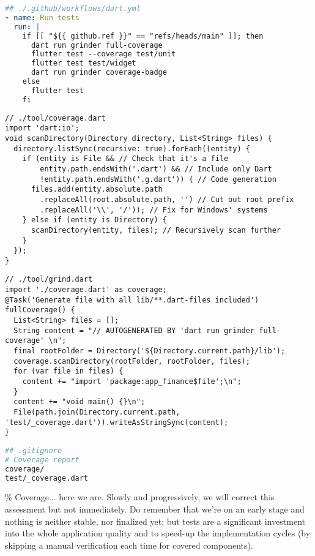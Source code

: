 \begin{lstlisting}[language=yaml]
## ./.github/workflows/dart.yml
- name: Run tests
  run: |
    if [[ "${{ github.ref }}" == "refs/heads/main" ]]; then
      dart run grinder full-coverage
      flutter test --coverage test/unit
      flutter test test/widget
      dart run grinder coverage-badge
    else
      flutter test
    fi
\end{lstlisting}

\begin{lstlisting}
// ./tool/coverage.dart
import 'dart:io';
void scanDirectory(Directory directory, List<String> files) {
  directory.listSync(recursive: true).forEach((entity) {
    if (entity is File && // Check that it's a file
        entity.path.endsWith('.dart') && // Include only Dart
        !entity.path.endsWith('.g.dart')) { // Code generation
      files.add(entity.absolute.path
        .replaceAll(root.absolute.path, '') // Cut out root prefix
        .replaceAll('\\', '/')); // Fix for Windows' systems
    } else if (entity is Directory) {
      scanDirectory(entity, files); // Recursively scan further
    }
  });
}
\end{lstlisting}

\begin{lstlisting}
// ./tool/grind.dart
import './coverage.dart' as coverage;
@Task('Generate file with all lib/**.dart-files included')
fullCoverage() {
  List<String> files = [];
  String content = "// AUTOGENERATED BY 'dart run grinder full-coverage' \n";
  final rootFolder = Directory('${Directory.current.path}/lib');
  coverage.scanDirectory(rootFolder, rootFolder, files);
  for (var file in files) {
    content += "import 'package:app_finance$file';\n";
  }
  content += "void main() {}\n";
  File(path.join(Directory.current.path, 'test/_coverage.dart')).writeAsStringSync(content);
}
\end{lstlisting}

\begin{lstlisting}[language=bash]
## .gitignore
# Coverage report
coverage/
test/_coverage.dart
\end{lstlisting}

\% Coverage... here we are. Slowly and progressively, we will correct this assessment but not immediately.
Do remember that we're on an early stage and nothing is neither stable, nor finalized yet; but tests are a significant
investment into the whole application quality and to speed-up the implementation cycles (by skipping a manual 
verification each time for covered components).
